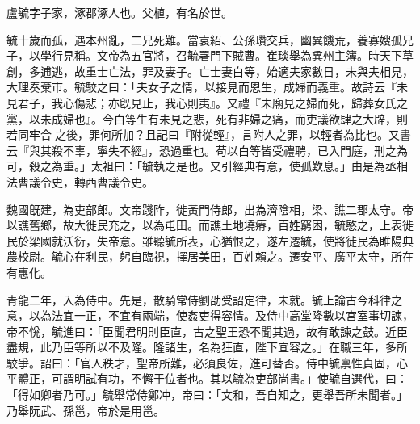 \begin{pinyinscope}
 
 
 盧毓字子家，涿郡涿人也。父植，有名於世。
 
 
 毓十歲而孤，遇本州亂，二兄死難。當袁紹、公孫瓚交兵，幽兾饑荒，養寡嫂孤兄子，以學行見稱。文帝為五官將，召毓署門下賊曹。崔琰舉為兾州主簿。時天下草創，多逋逃，故重士亡法，罪及妻子。亡士妻白等，始適夫家數日，未與夫相見，大理奏棄巿。毓駮之曰：「夫女子之情，以接見而恩生，成婦而義重。故詩云『未見君子，我心傷悲；亦旣見止，我心則夷』。又禮『未廟見之婦而死，歸葬女氏之黨，以未成婦也』。今白等生有未見之悲，死有非婦之痛，而吏議欲肆之大辟，則若同牢合𢀿之後，罪何所加？且記曰『附從輕』，言附人之罪，以輕者為比也。又書云『與其殺不辜，寧失不經』，恐過重也。苟以白等皆受禮聘，已入門庭，刑之為可，殺之為重。」太祖曰：「毓執之是也。又引經典有意，使孤歎息。」由是為丞相法曹議令史，轉西曹議令史。
 
 
 
 
 魏國旣建，為吏部郎。文帝踐阼，徙黃門侍郎，出為濟陰相，梁、譙二郡太守。帝以譙舊鄉，故大徙民充之，以為屯田。而譙土地墝瘠，百姓窮困，毓愍之，上表徙民於梁國就沃衍，失帝意。雖聽毓所表，心猶恨之，遂左遷毓，使將徙民為睢陽典農校尉。毓心在利民，躬自臨視，擇居美田，百姓賴之。遷安平、廣平太守，所在有惠化。
 
 
 
 
 青龍二年，入為侍中。先是，散騎常侍劉劭受詔定律，未就。毓上論古今科律之意，以為法宜一正，不宜有兩端，使姦吏得容情。及侍中高堂隆數以宮室事切諫，帝不恱，毓進曰：「臣聞君明則臣直，古之聖王恐不聞其過，故有敢諫之鼓。近臣盡規，此乃臣等所以不及隆。隆諸生，名為狂直，陛下宜容之。」在職三年，多所駮爭。詔曰：「官人秩才，聖帝所難，必須良佐，進可替否。侍中毓禀性貞固，心平體正，可謂明試有功，不懈于位者也。其以毓為吏部尚書。」使毓自選代，曰：「得如卿者乃可。」毓舉常侍鄭冲，帝曰：「文和，吾自知之，更舉吾所未聞者。」乃舉阮武、孫邕，帝於是用邕。
 
 
 

\end{pinyinscope}
